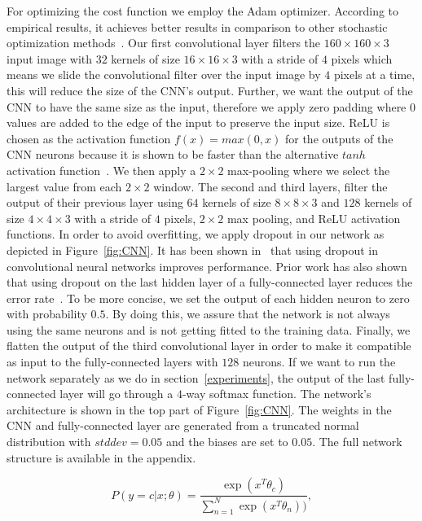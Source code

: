 \documentclass{article} %
\begin{document}
For optimizing the cost function we employ the Adam optimizer. According to empirical results, it achieves better results in comparison to other stochastic optimization methods~\cite{adam}. Our first convolutional layer filters the $160\times160\times3$ input image with $32$ kernels of size $16\times16\times3$ with a stride of $4$ pixels which means we slide the convolutional filter over the input image by $4$ pixels at a time, this will reduce the size of the CNN's output. Further, we want the output of the CNN to have the same size as the input, therefore we apply zero padding where $0$ values are added to the edge of the input to preserve the input size. ReLU is chosen as the activation function $f(x) = max(0,x)$ for the outputs of the CNN neurons because it is shown to be faster than the alternative $tanh$ activation function~\cite{imagehinton}. We then apply a $2\times2$ max-pooling where we select the largest value from each $2\times2$ window. 
The second and third layers, filter the output of their previous layer using $64$ kernels of size $8\times8\times3$ and $128$ kernels of size $4\times4\times3$ with a stride of $4$ pixels, $2\times2$ max pooling, and ReLU activation functions. In order to avoid overfitting, we apply dropout in our network as depicted in Figure~\ref{fig:CNN}. It has been shown in~\cite{CNNdropout2} that using dropout in convolutional neural networks improves performance. Prior work has also shown that using dropout on the last hidden layer of a fully-connected layer reduces the error rate~\cite{CNNdropout}. To be more concise, we set the output of each hidden neuron to zero with probability $0.5$. By doing this, we assure that the network is not always using the same neurons and is not getting fitted to the training data.
Finally, we flatten the output of the third convolutional layer in order to make it compatible as input to the fully-connected layers with $128$ neurons. If we want to run the network separately as we do in section~\ref{experiments}, the output of the last fully-connected layer will go through a $4$-way softmax function. The network's architecture is shown in the top part of Figure~\ref{fig:CNN}. The weights in the CNN and fully-connected layer are generated from a truncated normal distribution with $stddev = 0.05$ and the biases are set to $0.05$. The full network structure is available in the appendix.

\begin{equation}
  \label{softmax}
  P(y=c | x; \theta) = \frac{\exp(x^T \theta_c)}{\sum^{N}_{n=1} \exp(x^T \theta_n))},
\end{equation}
\end{document}
